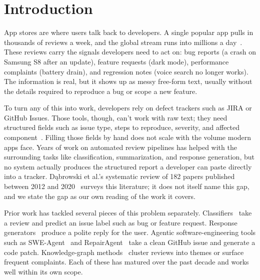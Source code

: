 \documentclass[sigconf, anonymous]{acmart}
\begin{document}
\maketitle

\section{Introduction}\label{introduction}

App stores are where users talk back to developers. A single popular app pulls in thousands of reviews a week, and the global stream runs into millions a day~\cite{maalej2015bug, gao2019automating, dkabrowski2022analysing}. These reviews carry the signals developers need to act on: bug reports (a crash on Samsung S8 after an update), feature requests (dark mode), performance complaints (battery drain), and regression notes (voice search no longer works). The information is real, but it shows up as messy free-form text, usually without the details required to reproduce a bug or scope a new feature.

To turn any of this into work, developers rely on defect trackers such as JIRA or GitHub Issues. Those tools, though, can't work with raw text; they need structured fields such as issue type, steps to reproduce, severity, and affected component~\cite{chaparro2017detecting,
zimmermann2010makes}. Filling those fields by hand does not scale with the volume modern apps face. Years of work on automated review pipelines has helped with the surrounding tasks like classification, summarization, and response generation, but no system actually produces the structured report a developer can paste directly into a tracker. D{\k a}browski et al.'s systematic review of 182 papers published between 2012 and
2020~\cite{dkabrowski2022analysing} surveys this literature; it does not itself name this gap, and
we state the gap as our own reading of the work it covers.

Prior work has tackled several pieces of this problem separately.
  Classifiers~\cite{maalej2015bug, chen2014ar, villarroel2016release, di2017surf} take a review
  and predict an issue label such as bug or feature request. Response
  generators~\cite{gao2019automating, gao2021automating, lewis2020retrieval} produce a polite reply for the user.
   Agentic software-engineering tools such as SWE-Agent~\cite{yang2024swe} and
  RepairAgent~\cite{bouzenia2025repairagent} take a clean GitHub issue and generate a code
  patch. Knowledge-graph methods~\cite{de2025reviewgraph, yu2024knowledge, keertipati2016approaches} cluster
  reviews into themes or surface frequent complaints. Each of these has matured over the past
  decade and works well within its own scope.
\end{document}
